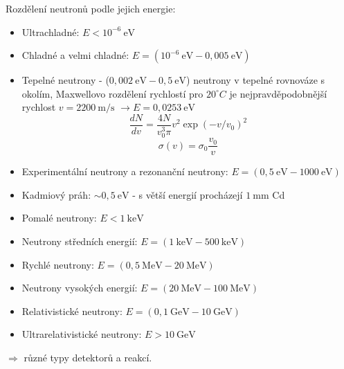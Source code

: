 \documentclass[../../main.tex]{subfiles}
\begin{document}
Rozdělení neutronů podle jejich energie:
\begin{itemize}
	\item Ultrachladné: $E < 10^{-6} ~\mathrm{eV}$
	\item Chladné a velmi chladné: $E = (10^{-6} ~\mathrm{eV} - 0,005 ~\mathrm{eV})$
	\item Tepelné neutrony - ($0,002 ~\mathrm{eV} - 0,5 ~\mathrm{eV}$) neutrony v tepelné rovnováze s okolím, Maxwellovo rozdělení rychlostí pro $20^ \circ C$ je nejpravděpodobnější rychlost $v = 2200 ~\mathrm{m/s}$ $\rightarrow E = 0,0253 ~\mathrm{eV}$
	\begin{equation}
	\dfrac{dN}{dv} = \dfrac{4 N}{v_{0}^3 {\pi}} v^2 \exp (- v/v_0)^2
	\end{equation}
	\begin{equation}
	\sigma (v) = \sigma_0 \dfrac{v_0}{v}
	\end{equation}
	\item Experimentální neutrony a rezonanční neutrony: $E = (0,5 ~\mathrm{eV} - 1000 ~\mathrm{eV})$
	\item Kadmiový práh: $\sim 0,5 ~\mathrm{eV}$ - s větší energií procházejí $1 ~\mathrm{mm}$ Cd
	\item Pomalé neutrony: $E < 1 ~\mathrm{keV}$
	\item Neutrony středních energií: $E = (1 ~\mathrm{keV} - 500 ~\mathrm{keV})$
	\item Rychlé neutrony: $E = (0,5 ~\mathrm{MeV} - 20 ~\mathrm{MeV})$
	\item Neutrony vysokých energií: $E = (20 ~\mathrm{MeV} - 100 ~\mathrm{MeV})$
	\item Relativistické neutrony: $E = (0,1 ~\mathrm{GeV} - 10 ~\mathrm{GeV})$
	\item Ultrarelativistické neutrony: $E > 10 ~\mathrm{GeV}$
\end{itemize} 
$\Rightarrow$ různé typy detektorů a reakcí.
\end{document}
